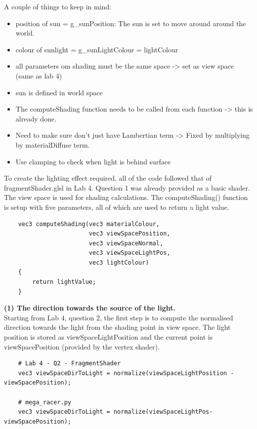 \documentclass[a4 paper, 12pt]{article}
\begin{document}
A couple of things to keep in mind:
    \begin{itemize}
        \item position of sun = g\_sunPosition: The sun is set to move around around the world.
        \item colour of sunlight = g\_sunLightColour = lightColour
        \item all parameters om shading must be the same space -> set as view space (same as lab 4) 
        \item sun is defined in world space
        \item The computeShading function needs to be called from each function -> this is already done.
        \item Need to make sure don't just have Lambertian term -> Fixed by multiplying by materialDiffuse term.
        \item Use clamping to check when light is behind surface
    \end{itemize}



To create the lighting effect required, all of the code followed that of fragmentShader.glsl in Lab 4. Question 1 was already provided as a basic shader. The view space is used for shading calculations. The computeShading() function is setup with five parameters, all of which are used to return a light value.
    \begin{lstlisting}
    vec3 computeShading(vec3 materialColour, 
                        vec3 viewSpacePosition, 
                        vec3 viewSpaceNormal, 
                        vec3 viewSpaceLightPos, 
                        vec3 lightColour)
    {
        return lightValue;
    }
    \end{lstlisting}

\textbf{(1) The direction towards the source of the light.} \\
Starting from Lab 4, question 2, the first step is to compute the normalised direction towards the light from the shading point in view space. The light position is stored as viewSpaceLightPosition and the current point is viewSpacePosition (provided by the vertex shader). 
    \begin{lstlisting}
    # Lab 4 - Q2 - FragmentShader
    vec3 viewSpaceDirToLight = normalize(viewSpaceLightPosition - viewSpacePosition);
    
    # mega_racer.py
    vec3 viewSpaceDirToLight = normalize(viewSpaceLightPos- viewSpacePosition);
    \end{lstlisting}
\end{document}
